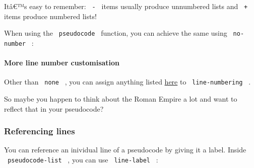 Itâ€™s easy to remember: \texttt{\ -\ } items usually produce unnumbered
lists and \texttt{\ +\ } items produce numbered lists!

When using the \texttt{\ pseudocode\ } function, you can achieve the
same using \texttt{\ no-number\ } :

\begin{Shaded}
\begin{Highlighting}[]
\NormalTok{)}
\end{Highlighting}
\end{Shaded}

\paragraph{More line number
customisation}\label{more-line-number-customisation}

Other than \texttt{\ none\ } , you can assign anything listed
\href{https://typst.app/docs/reference/model/numbering/\#parameters-numbering}{here}
to \texttt{\ line-numbering\ } .

So maybe you happen to think about the Roman Empire a lot and want to
reflect that in your pseudocode?

\begin{Shaded}
\begin{Highlighting}[]

\NormalTok{\#pseudocode{-}list(line{-}numbering: "I:")[}
\NormalTok{]}
\end{Highlighting}
\end{Shaded}

\pandocbounded{}

\subsubsection{Referencing lines}\label{referencing-lines}

You can reference an inividual line of a pseudocode by giving it a
label. Inside \texttt{\ pseudocode-list\ } , you can use
\texttt{\ line-label\ } :

